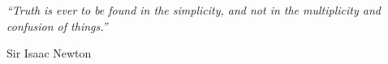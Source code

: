 \thispagestyle{empty}
\vspace*{\fill}
\begin{center}
\itshape
``Truth is ever to be found in the simplicity, and not in the multiplicity and confusion of things.''

\vspace{1em}
\normalfont Sir Isaac Newton
\end{center}
\vspace*{\fill}